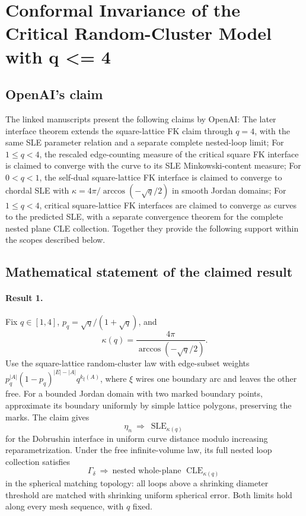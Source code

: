 \documentclass[11pt]{article}
\begin{document}
\section*{Conformal Invariance of the Critical Random-Cluster Model with q <= 4}

\subsection{OpenAI's claim}
The linked manuscripts present the following claims by OpenAI: The later interface theorem extends the square-lattice FK claim through $q=4$, with the same SLE parameter relation and a separate complete nested-loop limit; For $1\leq q<4$, the rescaled edge-counting measure of the critical square FK interface is claimed to converge with the curve to its SLE Minkowski-content measure; For $0<q<1$, the self-dual square-lattice FK interface is claimed to converge to chordal SLE with $\kappa=4\pi/\arccos(-\sqrt q/2)$ in smooth Jordan domains; For $1\leq q<4$, critical square-lattice FK interfaces are claimed to converge as curves to the predicted SLE, with a separate convergence theorem for the complete nested plane CLE collection. Together they provide the following support within the scopes described below.

\subsection{Mathematical statement of the claimed result}
\paragraph{Result 1.} Fix \(q\in[1,4]\), \(p_q=\sqrt q/(1+\sqrt q)\), and
\[
 \kappa(q)=\frac{4\pi}{\arccos(-\sqrt q/2)}.
\]
Use the square-lattice random-cluster law with edge-subset weights \(p_q^{|A|}(1-p_q)^{|E|-|A|}q^{k_\xi(A)}\), where \(\xi\) wires one boundary arc and leaves the other free. For a bounded Jordan domain with two marked boundary points, approximate its boundary uniformly by simple lattice polygons, preserving the marks. The claim gives
\[
 \eta_n\ \Longrightarrow\ \operatorname{SLE}_{\kappa(q)}
\]
for the Dobrushin interface in uniform curve distance modulo increasing reparametrization. Under the free infinite-volume law, its full nested loop collection satisfies
\[
 \Gamma_\delta\ \Longrightarrow\ \text{nested whole-plane }\operatorname{CLE}_{\kappa(q)}
\]
in the spherical matching topology: all loops above a shrinking diameter threshold are matched with shrinking uniform spherical error. Both limits hold along every mesh sequence, with \(q\) fixed.
\end{document}

